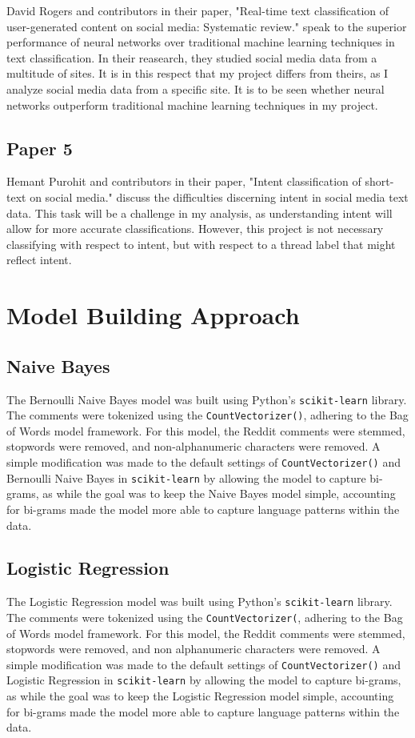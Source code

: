 \documentclass[twocolumn]{article}
\begin{document}
David Rogers and contributors in their paper, "Real-time text classification of user-generated content on social media: Systematic review." speak to the superior performance of neural networks over traditional machine learning techniques in text classification. In their reasearch, they studied social media data from a multitude of sites. It is in this respect that my project differs from theirs, as I analyze social media data from a specific site. It is to be seen whether neural networks outperform traditional machine learning techniques in my project.

\subsection{Paper 5}

Hemant Purohit and contributors in their paper, "Intent classification of short-text on social media." discuss the difficulties discerning intent in social media text data. This task will be a challenge in my analysis, as understanding intent will allow for more accurate classifications. However, this project is not necessary classifying with respect to intent, but with respect to a thread label that might reflect intent.

\section{Model Building Approach}
\subsection{Naive Bayes}
The Bernoulli Naive Bayes model was built using Python's \texttt{scikit-learn} library. The comments were tokenized using the \texttt{CountVectorizer()}, adhering to the Bag of Words model framework. For this model, the Reddit comments were stemmed, stopwords were removed, and non-alphanumeric characters were removed. A simple modification was made to the default settings of \texttt{CountVectorizer()} and Bernoulli Naive Bayes in \texttt{scikit-learn} by allowing the model to capture bi-grams, as while the goal was to keep the Naive Bayes model simple, accounting for bi-grams made the model more able to capture language patterns within the data.

\subsection{Logistic Regression}
The Logistic Regression model was built using Python's \texttt{scikit-learn} library. The comments were tokenized using the \texttt{CountVectorizer(}, adhering to the Bag of Words model framework. For this model, the Reddit comments were stemmed, stopwords were removed, and non alphanumeric characters were removed. A simple modification was made to the default settings of \texttt{CountVectorizer()} and Logistic Regression in \texttt{scikit-learn} by allowing the model to capture bi-grams, as while the goal was to keep the Logistic Regression model simple, accounting for bi-grams made the model more able to capture language patterns within the data.
\end{document}
